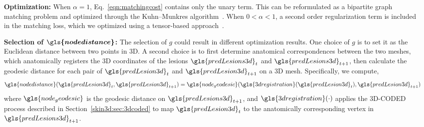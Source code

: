 \documentclass[journal]{IEEEtran}
\begin{document}
\textbf{Optimization:} When $\alpha = 1$, Eq.~\ref{eqn:matchingcost}  contains only the unary term. This can be reformulated as a bipartite graph matching problem and optimized through the Kuhn–Munkres algorithm~\citep{munkres1957algorithms}. When $0 < \alpha <1$, a second order regularization term is included in the matching loss, which we optimized using a tensor-based approach~\citep{duchenne2011tensor}.

\textbf{Selection of $\boldsymbol{\gls{nodedistance}}$:} 
The selection of $g$ could result in different optimization results. One choice of $g$ is to set it as the Euclidean distance between two points in 3D. A second choice is to first determine anatomical correspondences between the two meshes, which anatomically registers the 3D coordinates of the lesions $\gls{predLesions3d}_{t}$ and $\gls{predLesions3d}_{t+1}$, then calculate the geodesic distance for each pair of $\gls{predLesion3d}_t$ and $\gls{predLesion3d}_{t+1}$ on a 3D mesh. Specifically, we compute,
\begin{equation}
    \gls{nodedistance}(\gls{predLesion3d}_t, \gls{predLesion3d}_{t+1})=\gls{node_geodesic}(\gls{3dregistration}(\gls{predLesion3d}_t), \gls{predLesion3d}_{t+1})
\end{equation}
where $\gls{node_geodesic}$ is the geodesic distance on $\gls{predLesions3d}_{t+1}$, and $\gls{3dregistration}(\cdot)$ applies the 3D-CODED~\citep{Groueix2018} process described in Section~\ref{skin3d:sec:3dcoded} to map $\gls{predLesion3d}_t$ to the anatomically corresponding vertex in $\gls{predLesions3d}_{t+1}$.
\end{document}
